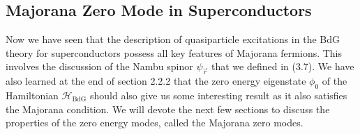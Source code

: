 \documentclass[11pt, oneside]{book}
\theoremstyle{break}
\theoremstyle{break}
\begin{document}
\subsection{Majorana Zero Mode in Superconductors}
Now we have seen that the description of quasiparticle excitations in the BdG theory for superconductors possess all key features of Majorana fermions. This involves the discussion of the Nambu spinor $\psi_{\vec{r}}$ that we defined in (3.7). We have also learned at the end of section 2.2.2 that the zero energy eigenstate $\phi_0$ of the Hamiltonian $\mathcal{H}_{\text{BdG}}$ should also give us some interesting result as it also satisfies the Majorana condition. We will devote the next few sections to discuss the properties of the zero energy modes, called the Majorana zero modes. \\
\end{document}
